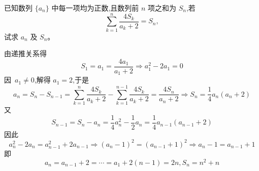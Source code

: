 \begin{questions}
    \question 已知数列 $\{a_n\}$ 中每一项均为正数,且数列前 $n$ 项之和为 $S_n$,若 
    \[
    \sum_{k=1}^{n}\frac{4S_k}{a_k+2}=S_n,
    \]
    试求 $a_n$ 及 $S_n$。
    \begin{solution}
        由递推关系得
        \[
        S_1 = a_1 = \frac{4a_1}{a_1+2} 
        \Rightarrow a_1^2 - 2a_1 = 0 
        \]
        因\ $a_1 \ne 0$,解得 $a_1 = 2$,于是
        \[
        a_n = S_n - S_{n-1} = \sum_{k=1}^n \frac{4S_k}{a_k+2} - \sum_{k=1}^{n-1} \frac{4S_k}{a_k+2} = \frac{4S_n}{a_n+2} 
        \Rightarrow S_n = \frac{1}{4}a_n(a_n+2)
        \]
        又
        \[
        S_{n-1} = S_n-a_n= \frac{1}{4}a_n^2 - \frac{1}{2}a_n = \frac{1}{4}a_{n-1}(a_{n-1}+2)
        \]
        因此
        \[
        a_n^2 - 2a_n = a_{n-1}^2 + 2a_{n-1}
        \Rightarrow (a_n - 1)^2 = (a_{n-1} + 1)^2
        \Rightarrow a_n - 1 = a_{n-1} + 1
        \]
        即
        \[
        a_n = a_{n-1} + 2 = \cdots = a_1 + 2(n-1) = 2n, S_n = n^2 + n
        \]
    \end{solution}


\end{questions}
